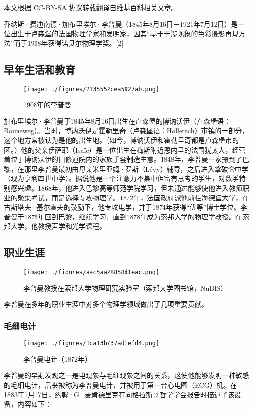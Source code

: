 
本文根据 CC-BY-SA 协议转载翻译自维基百科\href{https://en.wikipedia.org/wiki/Gabriel_Lippmann}{相关文章}。

乔纳斯·费迪南德·加布里埃尔·李普曼（1845年8月16日－1921年7月12日）是一位出生于卢森堡的法国物理学家和发明家，因其“基于干涉现象的色彩摄影再现方法”而于1908年获得诺贝尔物理学奖。[2]
\subsection{早年生活和教育}
\begin{figure}[ht]
\centering
\texttt{[image: ./figures/2135552cea5927ab.png]}
\caption{1908年的李普曼} \label{fig_LPM_1}
\end{figure}
加布里埃尔·李普曼于1845年8月16日出生在卢森堡的博讷沃伊（卢森堡语：Bouneweg）。当时，博讷沃伊是霍勒里奇（卢森堡语：Hollerech）市镇的一部分，这个地方常被认为是他的出生地。（如今，博讷沃伊和霍勒里奇都是卢森堡市的区。）他的父亲伊萨耶（Isaïe）是一位出生在梅斯附近恩内里的法国犹太人，经营着位于博讷沃伊的旧修道院内的家族手套制造生意。1848年，李普曼一家搬到了巴黎，在那里李普曼最初由母亲米里亚姆·罗斯（Lévy）辅导，之后进入拿破仑中学（现为亨利四世中学）。据说他是一个注意力不集中但富有思考的学生，对数学特别感兴趣。1868年，他进入巴黎高等师范学院学习，但未通过能够使他进入教师职业的聚集考试，而是选择专攻物理学。1872年，法国政府派他前往海德堡大学，在古斯塔夫·基尔霍夫的鼓励下，他专攻电学，并于1874年获得“优等”博士学位。李普曼于1875年回到巴黎，继续学习，直到1878年成为索邦大学的物理学教授。在索邦大学，他教授声学和光学课程。
\subsection{职业生涯}  
\begin{figure}[ht]
\centering
\texttt{[image: ./figures/aac5aa28858d1eac.png]}
\caption{李普曼教授在索邦大学物理研究实验室（索邦大学图书馆，NuBIS）} \label{fig_LPM_2}
\end{figure}
李普曼在多年的职业生涯中对多个物理学领域做出了几项重要贡献。
\subsubsection{毛细电计}
\begin{figure}[ht]
\centering
\texttt{[image: ./figures/1ca13b737ad1efd4.png]}
\caption{李普曼电计（1872年）} \label{fig_LPM_3}
\end{figure}
李普曼的早期发现之一是电现象与毛细现象之间的关系，这使他能够发明一种敏感的毛细电计，后来被称为李普曼电计，并被用于第一台心电图（ECG）机。在1883年1月17日，约翰·G·麦肯德里克在向格拉斯哥哲学学会报告时描述了该设备，内容如下：

